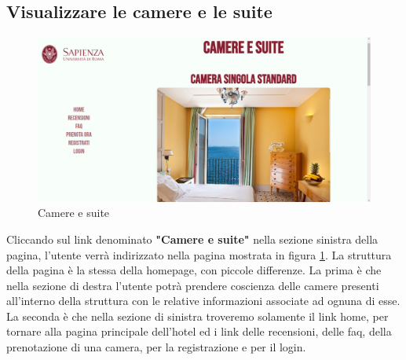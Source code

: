 \documentclass [a4paper, 12pt]{book}
\begin{document}
\medskip

\subsection{Visualizzare le camere e le suite}
\begin{figure}[h]
\centering 
\includegraphics[scale=0.3]{Camere.png}
\caption{Camere e suite}
\label{Camere}
\end{figure}
Cliccando sul link denominato \textbf{"Camere e suite"} nella sezione sinistra della pagina, l'utente verrà indirizzato nella pagina mostrata in figura \ref{Camere}. La struttura della pagina è la stessa della homepage, con piccole differenze. La prima è che nella sezione di destra l'utente potrà prendere coscienza delle camere presenti all'interno della struttura con le relative informazioni associate ad ognuna di esse. La seconda è che nella sezione di sinistra troveremo solamente il link home, per tornare alla pagina principale dell'hotel ed i link delle recensioni, delle faq, della prenotazione di una camera, per la registrazione e per il login. 

\medskip
\end{document}
